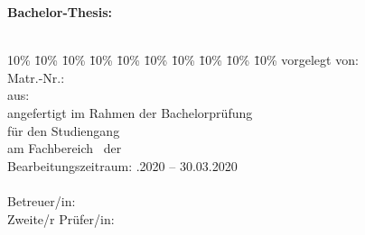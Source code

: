 \begin{titlepage}
  \begin{center}
  \textbf{Bachelor-Thesis:}\\
  \Huge{\myTitel}\\
  \vspace{0.2cm}
  \end{center}
  \normalsize
  \vfill
  \begin{tabbing}
    10\% \= 10\% \= 10\% \= 10\% \= 10\% \= 10\% \= 10\% \= 10\% \= 10\% \= 10\%\kill
    vorgelegt von: \> \> \> \> \> \> \> \> \> \myAutor\\
    Matr.-Nr.: \> \> \> \> \> \> \> \> \> \myMatrikelNr\\
    aus: \> \> \> \> \> \> \> \> \> \myLocation\\
    angefertigt im Rahmen der Bachelorprüfung\\%
    für den Studiengang \myStudiengang \\%
    am Fachbereich \myFachbereich\ der \myHochschulName \\
    Bearbeitungszeitraum: \> \> \> \> \> \> \> \> .2020 -- 30.03.2020 \\
    \\
    Betreuer/in: \> \> \> \> \> \> \> \> \> \myBetreuer\\
    Zweite/r Prüfer/in: \> \> \> \> \> \> \> \> \> \myZweitpruefer\\
  \end{tabbing}
\end{titlepage}
